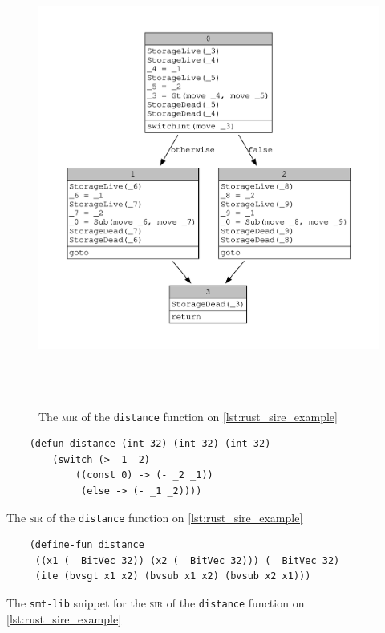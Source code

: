 \begin{figure}[ht]
    \centering
    \includegraphics[height=15cm]{images/distance.pdf}
    \caption{The \textsc{mir} of the \texttt{distance} function on \ref{lst:rust_sire_example}}
  \label{lst:mir_sire_example}
\end{figure}

\begin{listing}[ht]
    \begin{verbatim}
    (defun distance (int 32) (int 32) (int 32) 
        (switch (> _1 _2) 
            ((const 0) -> (- _2 _1)) 
             (else -> (- _1 _2))))
    \end{verbatim}
    \caption{The \textsc{sir} of the \texttt{distance} function on \ref{lst:rust_sire_example}}
  \label{lst:sir_sire_example}
\end{listing}

\begin{listing}[ht]
    \begin{verbatim}
    (define-fun distance 
     ((x1 (_ BitVec 32)) (x2 (_ BitVec 32))) (_ BitVec 32) 
     (ite (bvsgt x1 x2) (bvsub x1 x2) (bvsub x2 x1)))
    \end{verbatim}
    \caption{The \texttt{smt-lib} snippet for the \textsc{sir} of the \texttt{distance} function on \ref{lst:rust_sire_example}}
  \label{lst:smt_sire_example}
\end{listing}


